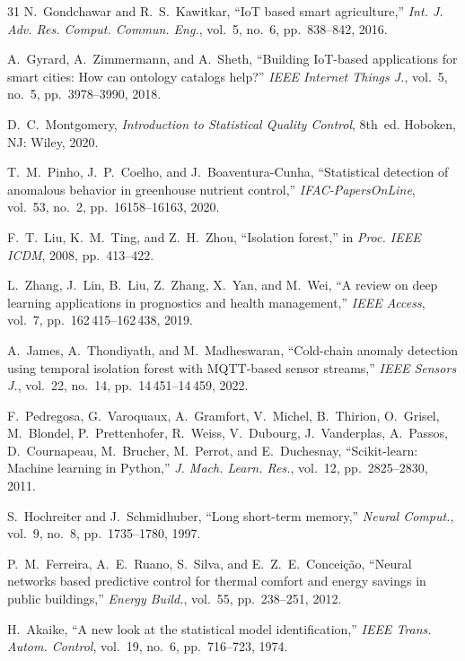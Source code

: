 \documentclass[journal,10pt,twocolumn]{IEEEtran}
\begin{document}
\begin{thebibliography}{31}
N.~Gondchawar and R.~S.~Kawitkar,
``IoT based smart agriculture,''
\emph{Int. J. Adv. Res. Comput. Commun. Eng.}, vol.~5, no.~6,
pp.~838--842, 2016.

A.~Gyrard, A.~Zimmermann, and A.~Sheth,
``Building IoT-based applications for smart cities: How can
ontology catalogs help?''
\emph{IEEE Internet Things J.}, vol.~5, no.~5,
pp.~3978--3990, 2018.

D.~C.~Montgomery,
\emph{Introduction to Statistical Quality Control}, 8th~ed.
Hoboken, NJ: Wiley, 2020.

T.~M.~Pinho, J.~P.~Coelho, and J.~Boaventura-Cunha,
``Statistical detection of anomalous behavior in greenhouse
nutrient control,''
\emph{IFAC-PapersOnLine}, vol.~53, no.~2, pp.~16158--16163, 2020.

F.~T.~Liu, K.~M.~Ting, and Z.~H.~Zhou,
``Isolation forest,''
in \emph{Proc. IEEE ICDM}, 2008, pp.~413--422.

L.~Zhang, J.~Lin, B.~Liu, Z.~Zhang, X.~Yan, and M.~Wei,
``A review on deep learning applications in prognostics and
health management,''
\emph{IEEE Access}, vol.~7, pp.~162\,415--162\,438, 2019.

A.~James, A.~Thondiyath, and M.~Madheswaran,
``Cold-chain anomaly detection using temporal isolation forest
with MQTT-based sensor streams,''
\emph{IEEE Sensors J.}, vol.~22, no.~14,
pp.~14\,451--14\,459, 2022.

F.~Pedregosa, G.~Varoquaux, A.~Gramfort, V.~Michel, B.~Thirion,
O.~Grisel, M.~Blondel, P.~Prettenhofer, R.~Weiss, V.~Dubourg,
J.~Vanderplas, A.~Passos, D.~Cournapeau, M.~Brucher, M.~Perrot,
and E.~Duchesnay,
``Scikit-learn: Machine learning in Python,''
\emph{J. Mach. Learn. Res.}, vol.~12, pp.~2825--2830, 2011.

S.~Hochreiter and J.~Schmidhuber,
``Long short-term memory,''
\emph{Neural Comput.}, vol.~9, no.~8, pp.~1735--1780, 1997.

P.~M.~Ferreira, A.~E.~Ruano, S.~Silva, and E.~Z.~E.~Conceição,
``Neural networks based predictive control for thermal comfort
and energy savings in public buildings,''
\emph{Energy Build.}, vol.~55, pp.~238--251, 2012.

H.~Akaike,
``A new look at the statistical model identification,''
\emph{IEEE Trans. Autom. Control}, vol.~19, no.~6,
pp.~716--723, 1974.


\end{thebibliography}
\end{document}

